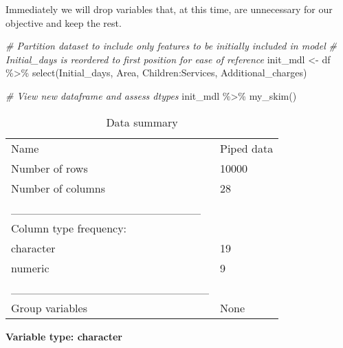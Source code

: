 \documentclass[
]{article}
\newenvironment{Shaded}{\begin{snugshade}}{\end{snugshade}}
\newcommand{\CommentTok}[1]{\textcolor[rgb]{0.56,0.35,0.01}{\textit{#1}}}
\newcommand{\FunctionTok}[1]{\textcolor[rgb]{0.00,0.00,0.00}{#1}}
\newcommand{\NormalTok}[1]{#1}
\newcommand{\OtherTok}[1]{\textcolor[rgb]{0.56,0.35,0.01}{#1}}
\newcommand{\SpecialCharTok}[1]{\textcolor[rgb]{0.00,0.00,0.00}{#1}}
\begin{document}
Immediately we will drop variables that, at this time, are unnecessary
for our objective and keep the rest.

\begin{Shaded}
\begin{Highlighting}[]
\CommentTok{\# Partition dataset to include only features to be initially included in model}
\CommentTok{\# Initial\_days is reordered to first position for ease of reference}
\NormalTok{init\_mdl }\OtherTok{\textless{}{-}}\NormalTok{ df }\SpecialCharTok{\%\textgreater{}\%}
  \FunctionTok{select}\NormalTok{(Initial\_days,}
\NormalTok{         Area,}
\NormalTok{         Children}\SpecialCharTok{:}\NormalTok{Services,}
\NormalTok{         Additional\_charges)}

\CommentTok{\# View new dataframe and assess dtypes}
\NormalTok{init\_mdl }\SpecialCharTok{\%\textgreater{}\%}
  \FunctionTok{my\_skim}\NormalTok{()}
\end{Highlighting}
\end{Shaded}

\begin{longtable}[]{@{}ll@{}}
\caption{Data summary}\tabularnewline
\toprule
\endhead
Name & Piped data \\
Number of rows & 10000 \\
Number of columns & 28 \\
\_\_\_\_\_\_\_\_\_\_\_\_\_\_\_\_\_\_\_\_\_\_\_ & \\
Column type frequency: & \\
character & 19 \\
numeric & 9 \\
\_\_\_\_\_\_\_\_\_\_\_\_\_\_\_\_\_\_\_\_\_\_\_\_ & \\
Group variables & None \\
\bottomrule
\end{longtable}

\textbf{Variable type: character}
\end{document}
